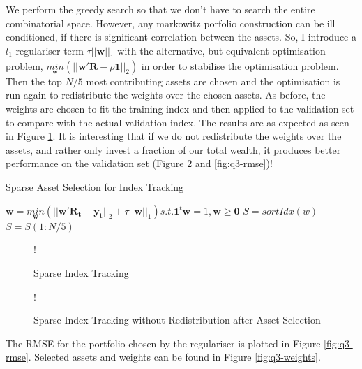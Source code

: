 \documentclass[11pt]{article}
\begin{document}
We perform the greedy search so that we don't have to search the entire combinatorial space. However, any markowitz
porfolio construction can be ill conditioned, if there is significant correlation between the assets. So, I introduce
a $l_1$ regulariser term $\tau||\bm{w}||_1$ with the alternative, but equivalent optimisation problem, 
$\underset{\bm{w}}{min}(||\bm{w}'\bm{R} - \rho\bm{1}||_2)$ in order to stabilise the optimisation problem. Then the top
$N/5$ most contributing assets are chosen and the optimisation is run again to redistribute the weights over the 
chosen assets. As before, the weights are chosen to fit the training index and then applied to the validation set
to compare with the actual validation index. The results are as expected as seen in Figure \ref{fig:q3-sparse}.
It is interesting that if we do not redistribute the weights over the assets, and rather only invest a fraction of
our total wealth, it produces better performance on the validation set (Figure \ref{fig:q3-sparse-no-distribution} and \ref{fig:q3-rmse})!\\

\begin{algorithm}[H]
\caption{Sparse Asset Selection for Index Tracking}
\label{alg:sparse-index}
\begin{algorithmic}

\State $\bm{w} = \underset{\bm{w}}{min}(||\bm{w}'\bm{R_t} - \bm{y_t}||_2 + \tau||\bm{w}||_1) s.t. \bm{1}^t\bm{w} = 1, \bm{w} \geq \bm{0}$
\State $S = sortIdx(w)$
\State $S = S(1:N/5)$

\end{algorithmic}
\end{algorithm}

\begin{figure}[!h]
   \vspace{-0.5cm}
	\centering 
 	 {!} { }
    \caption{Sparse Index Tracking}
	\label{fig:q3-sparse}
\end{figure}

\begin{figure}[!h]
	\vspace{-0.5cm}
   \centering 
 	 {!} { }
    \caption{Sparse Index Tracking without Redistribution after Asset Selection}
	\label{fig:q3-sparse-no-distribution}
	\vspace{-0.5cm}
\end{figure}

The RMSE for the portfolio chosen by the regulariser is plotted in Figure \ref{fig:q3-rmse}. Selected assets and weights can be found in Figure \ref{fig:q3-weights}.\\
\end{document}

